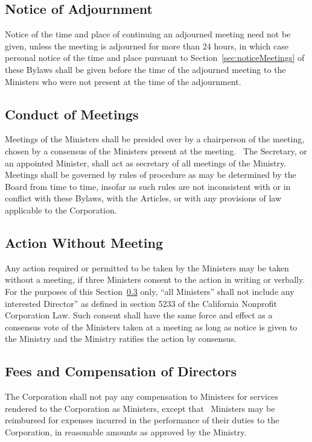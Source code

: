 \documentclass[letterpaper,titlepage]{article}
\begin{document}
\subsection{Notice of Adjournment}
Notice of the time and place of continuing an adjourned meeting need not be
given, unless the meeting is adjourned for more than 24 hours, in which case
personal notice of the time and place pursuant to
Section~\ref{sec:noticeMeetings} of these Bylaws shall be given before the time
of the adjourned meeting to the Ministers who were not present at the time of
the adjournment.
\subsection{Conduct of Meetings}
\label{sec:conductMeetings}
Meetings of the Ministers shall be presided over by a chairperson of the
meeting, chosen by a consensus of the Ministers present at the meeting.  The
Secretary, or an appointed Minister, shall act as secretary of all meetings of
the Ministry.  Meetings shall be governed by rules of procedure as may be
determined by the Board from time to time, insofar as such rules are not
inconsistent with or in conflict with these Bylaws, with the Articles, or with
any provisions of law applicable to the Corporation.
\subsection{Action Without Meeting}
\label{sec:actionWithout}
Any action required or permitted to be taken by the Ministers may be taken
without a meeting, if three Ministers consent to the action in writing or
verbally. For the purposes of this Section~\ref{sec:actionWithout} only, ``all
Ministers'' shall not include any interested Director” as defined in section
5233 of the California Nonprofit Corporation Law. Such consent shall have the
same force and effect as a consensus vote of the Ministers taken at a meeting
as long as notice is given to the Ministry and the Ministry ratifies the action
by consensus.
\subsection{Fees and Compensation of Directors}
\label{sec:feesCompensation}
The Corporation shall not pay any compensation to Ministers for services
rendered to the Corporation as Ministers, except that  Ministers may be
reimbursed for expenses incurred in the performance of their duties to the
Corporation, in reasonable amounts as approved by the Ministry.
\end{document}
